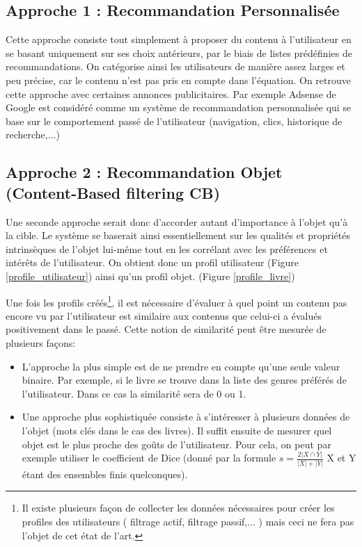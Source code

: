 \documentclass[light]{ceri}
\begin{document}
\subsection{Approche 1 : Recommandation Personnalisée }
    Cette approche consiste tout simplement à proposer du contenu à l'utilisateur en se basant uniquement sur ses choix antérieurs, par le biais de listes prédéfinies de recommandations. On catégorise ainsi les utilisateurs de manière assez larges et peu précise, car le contenu n'est pas pris en compte dans l'équation.
    On retrouve cette approche avec certaines annonces publicitaires. Par exemple Adsense de Google est considéré comme un système de recommandation personnalisée qui se base sur le comportement passé de l’utilisateur (navigation, clics, historique de recherche,...)


\subsection{Approche 2 : Recommandation Objet (Content-Based filtering CB)\cite{Objet}}
    
    Une seconde approche serait donc d'accorder autant d'importance à l'objet qu'à la cible. Le système se baserait ainsi essentiellement sur les qualités et propriétés intrinsèques de l’objet lui-même tout en les corrélant avec les préférences et intérêts de l’utilisateur. On obtient donc un profil utilisateur (Figure \ref{profile_utilisateur}) ainsi qu'un profil objet. (Figure \ref{profile_livre})

    Une fois les profils créés\footnote[2]{ Il existe plusieurs façon de collecter les données nécessaires pour créer les profiles des utilisateurs ( filtrage actif, filtrage passif,... ) mais ceci ne fera pas l'objet de cet état de l'art. }, il est nécessaire d'évaluer à quel point un contenu pas encore vu par l’utilisateur est similaire aux contenus que celui-ci a évalués positivement dans le passé. Cette notion de similarité peut être mesurée de plusieurs façons:
        \begin{itemize}
            \item L'approche la plus simple est de ne prendre en compte qu'une seule valeur binaire. Par exemple, si le livre  se trouve dans la liste des genres préférés de l’utilisateur. Dans ce cas la similarité sera de 0 ou 1.
            
            \item Une approche plus sophistiquée consiste à s'intéresser à plusieurs données de l'objet (mots clés dans le cas des livres). Il suffit ensuite de mesurer quel objet est le plus proche des goûts de l'utilisateur. Pour cela, on peut par exemple utiliser le coefficient de Dice (donné par la formule $s=\frac{2|X \cap Y|}{|X|+|Y|}$ X et Y étant des ensembles finis quelconques).
        \end{itemize}
    
\end{document}
